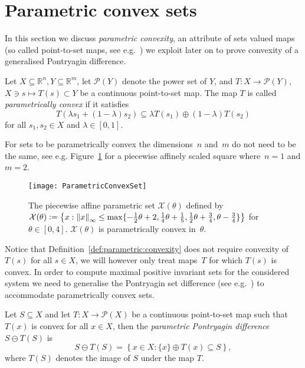 \section{Parametric convex sets}\label{sec:parametric:convex:sets}
In this section we discuss \emph{parametric convexity}, an attribute of sets valued maps 
(so called point-to-set maps, see e.g.~\cite{Hogan:1973}) we exploit later on to prove 
convexity of a generalised Pontryagin difference.
%
\begin{defn}\label{def:parametric:convexity}
	Let $X\subseteq\mathbb R^n, Y\subseteq\mathbb R^m$, let $\mathcal P(Y)$ denote the power set of $Y$, 
	and $T:X\rightarrow \mathcal P(Y)$, $X\ni s\mapsto T(s)\subset Y$ be a 
	continuous point-to-set map. The map $T$ is called \emph{parametrically convex} if it satisfies
	\begin{equation}\label{eq:def:parametrically:convex}
	T(\lambda s_1 + (1-\lambda)s_2)\subseteq\lambda T(s_1) \oplus (1-\lambda) T(s_2)
	\end{equation}
	for all $s_1,s_2\in X$ and $\lambda\in[0,1]$.
\end{defn}
%
For sets to be parametrically convex the dimensions~$n$ and~$m$ do not need to be the same, see e.g.
Figure~\ref{fig:parametrically:convex:set} for a piecewise affinely scaled square where~$n=1$ and $m=2$.
%
\begin{figure}
\centering
\texttt{[image: ParametricConvexSet]}
\caption[A parametrically convex set.]{The piecewise affine parametric set $\mathcal X(\theta)$ 
defined by $\mathcal X(\theta)\mathrel{\mathop:}=\left\{x:\left\|x\right\|_\infty\leq\max\{-\frac{1}{2}
\theta+2,\frac{1}{4}\theta+\frac{1}{5},\frac{1}{2}\theta+\frac{3}{4},\theta-\frac{3}{4}\}\right\}$ 
for $\theta\in[0,4]$. $\mathcal X(\theta)$ is parametrically convex in~$\theta$.}
\label{fig:parametrically:convex:set}
\end{figure}
%
Notice that Definition~\ref{def:parametric:convexity} does not require convexity of~$T(s)$ for all
$s\in X$, we will however only treat maps~$T$ for which $T(s)$ is convex.
%
In order to compute maximal positive invariant sets for the considered system we need to generalise
the Pontryagin set difference (see e.g.~\cite{blanchini:2007}) to accommodate parametrically convex sets.
%
\begin{defn}\label{def:parametric:pontryagin:difference}
	Let $S\subseteq X$ and let $T:X\to\mathcal P(X)$ be a continuous point-to-set map such that
	$T(x)$ is convex for all $x\in X$, then the \emph{parametric Pontryagin difference} 
	$S\ominus T(S)$ is 
	\begin{equation}\label{eq:definition:parametric:pontryagin:difference}
		S\ominus T(S) = \left\{x\in X: \{x\} \oplus T(x)\subseteq S\right\},
	\end{equation}
	where $T(S)$ denotes the image of $S$ under the map $T$. 
\end{defn}
